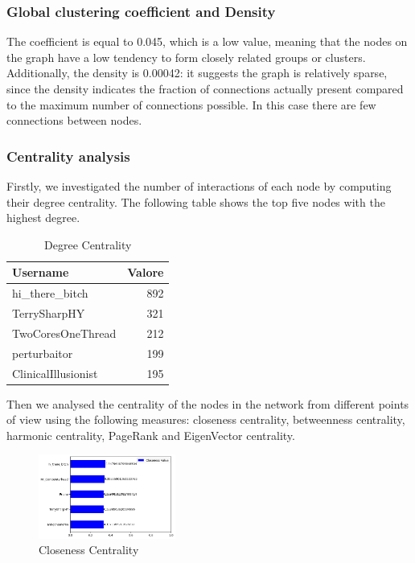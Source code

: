 \documentclass[sigchi]{acmart}
\begin{document}
\subsubsection{Global clustering coefficient and Density} The coefficient is equal to 0.045, which is a low value, meaning that the nodes on the graph have a low tendency to form closely related groups or clusters. Additionally, the density is 0.00042: it suggests the graph is relatively sparse, since the density indicates the fraction of connections actually present compared to the maximum number of connections possible. In this case there are few connections between nodes.

\subsubsection{Centrality analysis}  
Firstly, we investigated the number of interactions of each node by computing their degree centrality. The following table shows the top five nodes with the highest degree.
\begin{table}[htbp]
\centering
\caption{Degree Centrality}
\begin{adjustbox}{scale=0.85}
\begin{tabular}{lr}
\toprule
Username & Valore \\
\midrule
hi\_there\_bitch & 892 \\
TerrySharpHY & 321 \\
TwoCoresOneThread & 212 \\
perturbaitor & 199 \\
ClinicalIllusionist & 195 \\
\bottomrule
\end{tabular}
\end{adjustbox}
\end{table}

Then we analysed the centrality of the nodes in the network from different points of view using the following measures: closeness centrality, betweenness centrality, harmonic centrality, PageRank and EigenVector centrality.



\begin{figure}[!ht]
  \centering
  \includegraphics[width=0.4\textwidth]{closeness.png}
  \caption{Closeness Centrality}
  \label{fig:closeness_centrality}
\end{figure}
\end{document}
